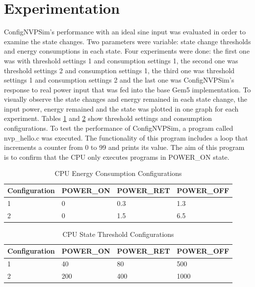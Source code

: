 \documentclass[conference]{IEEEtran}
\begin{document}
\section{\textbf{Experimentation}}
ConfigNVPSim's performance with an ideal sine input was evaluated in order to examine the state changes. Two parameters were variable: state change thresholds and energy consumptions in each state. Four experiments were done: the first one was with threshold settings 1 and consumption settings 1, the second one was threshold settings 2 and consumption settings 1, the third one was threshold settings 1 and consumption settings 2 and the last one was ConfigNVPSim's response to real power input that was fed into the base Gem5 implementation. To visually observe the state changes and energy remained in each state change,  the input power, energy remained and the state was plotted in one graph for each experiment. Tables \ref{table:cpuconsumption} and \ref{table:cputhresh} show threshold settings and consumption configurations.
To test the performance of ConfigNVPSim, a program called nvp\_hello.c was executed. The functionality of this program includes a loop that increments a counter from 0 to 99 and prints its value. The aim of this program is to confirm that the CPU only executes programs in POWER\_ON state. 
\begin{table}[]
\medskip
\begin{center}
\begin{tabular}{|l|l|l|l|}
\hline
\rowcolor[HTML]{D9D9D9} 
Configuration & POWER\_ON & POWER\_RET & POWER\_OFF \\ \hline
1             & 0         & 0.3        & 1.3        \\ \hline
2             & 0         & 1.5        & 6.5        \\ \hline
\end{tabular}
\end{center}
\medskip
\caption{CPU Energy Consumption Configurations}
\label{table:cpuconsumption}
\end{table}

\begin{table}[]
\medskip
\begin{center}
\begin{tabular}{|l|l|l|l|}
\hline
\rowcolor[HTML]{D9D9D9} 
Configuration & POWER\_ON & POWER\_RET & POWER\_OFF \\ \hline
1             & 40        & 80         & 500        \\ \hline
2             & 200       & 400        & 1000       \\ \hline
\end{tabular}
\end{center}
\medskip
\caption{CPU State Threshold Configurations}
\label{table:cputhresh}
\end{table}
\end{document}
